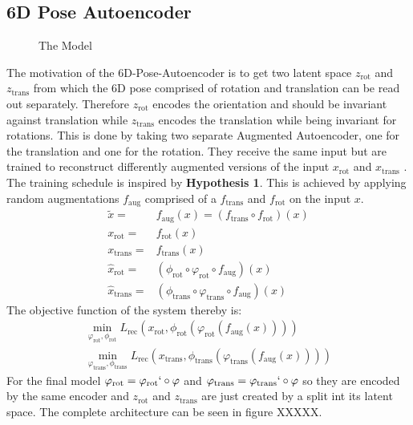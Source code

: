 \documentclass[10pt,a4paper]{article}
\newcommand{\rot}{\ensuremath{\text{rot}\xspace}}
\newcommand{\trans}{\ensuremath{\text{trans}\xspace}}
\begin{document}
\subsection{6D Pose Autoencoder}\label{6D Pose Autoencoder}
\begin{figure}[htb]
    \centering
    
    \caption{The Model}
\end{figure}
The motivation of the 6D-Pose-Autoencoder is to get two latent space $z_{\rot}$ and $z_{\trans}$ from which the 6D pose comprised of rotation and translation can be read out separately.
Therefore $z_{\rot}$ encodes the orientation and should be invariant against translation while $z_{\text{trans}}$ encodes the translation while being invariant for rotations. This is done by taking two separate Augmented Autoencoder, one for the translation and one for the rotation. They receive the same input but are trained to reconstruct differently augmented versions of the input $x_{\text{rot}}$ and $x_{\text{trans}}$ . The training schedule is inspired by \textbf{Hypothesis 1}.
This is achieved by applying random augmentations $f_{\text{aug}}$ comprised of a $f_{\trans}$ and $f_{\rot}$ on the input $x$. 
\begin{equation}
 \begin{aligned}
\tilde{x} = &f_{\text{aug}} (x) = (f_{\trans} \circ f_{\rot} ) (x) \\
x_{\rot} =&f_{\rot} (x) \\
x_{\trans} =&f_{\trans} (x) \\
\hat{x}_{\rot} =& (\phi_{\rot} \circ \varphi_{\rot} \circ f_{\text{aug}}) (x) \\
\hat{x}_{\trans} = &(\phi_{\trans} \circ \varphi_{\trans} \circ f_{\text{aug}}) (x)
\end{aligned}
\end{equation}
The objective function of the system thereby is:
\begin{equation}
 \begin{aligned}
\min_{\varphi_{\rot}, \phi_{\rot}}  L_{\text{rec}}(x_{\rot}, \phi_{\rot}(\varphi_{\rot}(f_{\text{aug}}(x) ))) \\
\min_{\varphi_{\trans}, \phi_{\trans}}  L_{\text{rec}}(x_{\trans}, \phi_{\trans}(\varphi_{\trans}(f_{\text{aug}}(x) ))) 
\end{aligned}
\end{equation}
For the final model $\varphi_{\rot} = \varphi_{\rot}` \circ \varphi$ and $\varphi_{\trans}= \varphi_{\trans}` \circ \varphi$ so they are encoded by the same encoder and $z_{\rot}$ and $z_{\trans}$ are just created by a split int its latent space. The complete architecture can be seen in figure XXXXX.
\end{document}

